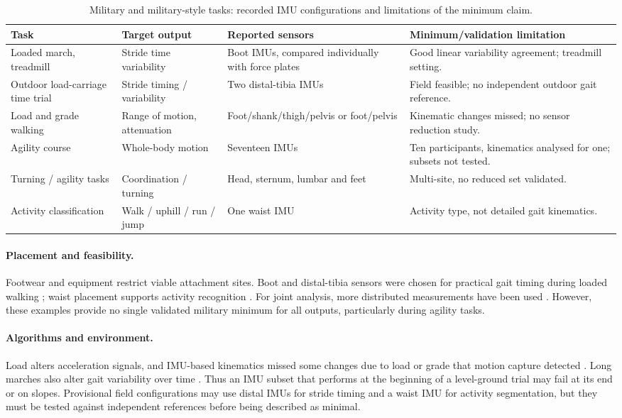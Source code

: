 \documentclass[10pt,a4paper,twocolumn]{article}
\begin{document}
\begin{table}[!t]
  \centering\footnotesize
  \caption{Military and military-style tasks: recorded IMU configurations and limitations of the minimum claim.}
  \label{tab:military}
  \begin{tabularx}{\linewidth}{@{}p{2.0cm}p{2cm}YY@{}}
  \toprule
  Task & Target output & Reported sensors & Minimum/validation limitation \\
  \midrule
  Loaded march, treadmill & Stride time variability & Boot IMUs, compared individually with force plates \citep{slattery2024} & Good linear variability agreement; treadmill setting. \\
  Outdoor load-carriage time trial & Stride timing / variability & Two distal-tibia IMUs \citep{feigel2026} & Field feasible; no independent outdoor gait reference. \\
  Load and grade walking & Range of motion, attenuation & Foot/shank/thigh/pelvis or foot/pelvis \citep{fain2024a,fain2024b} & Kinematic changes missed; no sensor reduction study. \\
  Agility course & Whole-body motion & Seventeen IMUs \citep{kessels2021} & Ten participants, kinematics analysed for one; subsets not tested. \\
  Turning / agility tasks & Coordination / turning & Head, sternum, lumbar and feet \citep{fino2025} & Multi-site, no reduced set validated. \\
  Activity classification & Walk / uphill / run / jump & One waist IMU \citep{papadakis2023} & Activity type, not detailed gait kinematics. \\
  \bottomrule
  \end{tabularx}
\end{table}

\paragraph{Placement and feasibility.} Footwear and equipment restrict viable attachment sites. Boot and distal-tibia sensors were chosen for practical gait timing during loaded walking \citep{slattery2024,feigel2026}; waist placement supports activity recognition \citep{papadakis2023}. For joint analysis, more distributed measurements have been used \citep{fain2024a,kessels2021}. However, these examples provide no single validated military minimum for all outputs, particularly during agility tasks.

\paragraph{Algorithms and environment.} Load alters acceleration signals, and IMU-based kinematics missed some changes due to load or grade that motion capture detected \citep{fain2024a,fain2024b}. Long marches also alter gait variability over time \citep{feigel2026}. Thus an IMU subset that performs at the beginning of a level-ground trial may fail at its end or on slopes. Provisional field configurations may use distal IMUs for stride timing and a waist IMU for activity segmentation, but they must be tested against independent references before being described as minimal.
\end{document}
